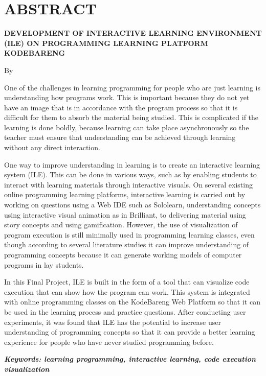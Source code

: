 \clearpage
\chapter*{ABSTRACT}

\begin{center}
  \center
  \large \bfseries \MakeUppercase{Development of Interactive Learning Environment (ILE) on Programming Learning Platform KodeBareng}

  \normalfont\normalsize
  By

  \theauthor
\end{center}

\vspace{1cm}

\begin{singlespace}
  One of the challenges in learning programming for people who are just learning is understanding how programs work. This is important because they do not yet have an image that is in accordance with the program process so that it is difficult for them to absorb the material being studied. This is complicated if the learning is done boldly, because learning can take place asynchronously so the teacher must ensure that understanding can be achieved through learning without any direct interaction.

  One way to improve understanding in learning is to create an interactive learning system (ILE). This can be done in various ways, such as by enabling students to interact with learning materials through interactive visuals. On several existing online programming learning platforms, interactive learning is carried out by working on questions using a Web IDE such as Sololearn, understanding concepts using interactive visual animation as in Brilliant, to delivering material using story concepts and using gamification. However, the use of visualization of program execution is still minimally used in programming learning classes, even though according to several literature studies it can improve understanding of programming concepts because it can generate working models of computer programs in lay students.

  In this Final Project, ILE is built in the form of a tool that can visualize code execution that can show how the program can work. This system is integrated with online programming classes on the KodeBareng Web Platform so that it can be used in the learning process and practice questions. After conducting user experiments, it was found that ILE has the potential to increase user understanding of programming concepts so that it can provide a better learning experience for people who have never studied programming before.
\end{singlespace}

\textbf{\textit{Keywords: learning programming, interactive learning, code execution visualization}}
\clearpage